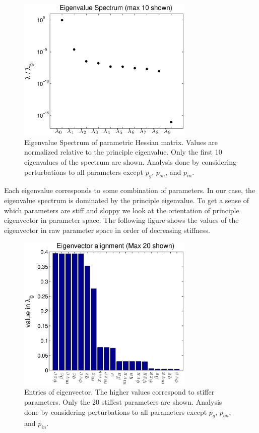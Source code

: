 \documentclass[preprint,authoryear,12pt]{elsarticle}
\begin{document}
\begin{figure}[h!]
    \includegraphics[width=0.75\textwidth]{figures/eigenvalue.eps}%
      \caption{Eigenvalue Spectrum of parametric Hessian matrix. Values are normalized relative to the principle eigenvalue. Only the first 10 eigenvalues of the spectrum are shown. Analysis done by considering perturbations to all parameters except $p_g$, $p_{on}$, and $p_{in}$.}\label{fig:eigenval} 
\end{figure}


Each eigenvalue corresponds to some combination of parameters. In our case, the eigenvalue spectrum is dominated by the principle eigenvalue. To get a sense of which parameters are stiff and sloppy we look at the orientation of principle eigenvector in parameter space. The following figure shows the values of the eigenvector in raw parameter space in order of decreasing stiffness.

\begin{figure}[h!]
    \includegraphics[width=0.75\textwidth]{figures/eigenvector.eps}%
      \caption{Entries of eigenvector. The higher values correspond to stiffer parameters. Only the 20 stiffest parameters are shown.  Analysis done by considering perturbations to all parameters except $p_g$, $p_{on}$, and $p_{in}$.}\label{fig:eigenvec} 
\end{figure}



\end{document}
